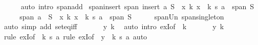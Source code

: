 \begin{isabellebody}
\ \ \ \ \isamarkupfalse%
\ {\isacharparenleft}{\kern0pt}auto\ intro{\isacharbang}{\kern0pt}{\isacharcolon}{\kern0pt}\ span{\isacharunderscore}{\kern0pt}add{\isacharparenright}{\kern0pt}\isanewline
{}\isamarkupfalse%
%
\endisatagproof
{\isafoldproof}%
%
\isadelimproof
\isanewline
%
\endisadelimproof
\isanewline
{}\isamarkupfalse%
\ span{\isacharunderscore}{\kern0pt}insert{\isacharcolon}{\kern0pt}\ {\isachardoublequoteopen}span\ {\isacharparenleft}{\kern0pt}insert\ a\ S{\isacharparenright}{\kern0pt}\ {\isacharequal}{\kern0pt}\ {\isacharbraceleft}{\kern0pt}x{\isachardot}{\kern0pt}\ {\isasymexists}k{\isachardot}{\kern0pt}\ {\isacharparenleft}{\kern0pt}x\ {\isacharminus}{\kern0pt}\ k\ {\isacharasterisk}{\kern0pt}s\ a{\isacharparenright}{\kern0pt}\ {\isasymin}\ span\ S{\isacharbraceright}{\kern0pt}{\isachardoublequoteclose}\isanewline
%
\isadelimproof
%
\endisadelimproof
%
\isatagproof
{}\isamarkupfalse%
\ {\isacharminus}{\kern0pt}\isanewline
\ \ \isamarkupfalse%
\ {\isachardoublequoteopen}span\ {\isacharparenleft}{\kern0pt}{\isacharbraceleft}{\kern0pt}a{\isacharbraceright}{\kern0pt}\ {\isasymunion}\ S{\isacharparenright}{\kern0pt}\ {\isacharequal}{\kern0pt}\ {\isacharbraceleft}{\kern0pt}x{\isachardot}{\kern0pt}\ {\isasymexists}k{\isachardot}{\kern0pt}\ {\isacharparenleft}{\kern0pt}x\ {\isacharminus}{\kern0pt}\ k\ {\isacharasterisk}{\kern0pt}s\ a{\isacharparenright}{\kern0pt}\ {\isasymin}\ span\ S{\isacharbraceright}{\kern0pt}{\isachardoublequoteclose}\isanewline
\ \ \ \ \isamarkupfalse%
\ span{\isacharunderscore}{\kern0pt}Un\ span{\isacharunderscore}{\kern0pt}singleton\isanewline
\ \ \ \ \isamarkupfalse%
\ {\isacharparenleft}{\kern0pt}auto\ simp\ add{\isacharcolon}{\kern0pt}\ set{\isacharunderscore}{\kern0pt}eq{\isacharunderscore}{\kern0pt}iff{\isacharparenright}{\kern0pt}\isanewline
\ \ \ \ \isamarkupfalse%
\ \ y\ k\ \isamarkupfalse%
\ {\isacharparenleft}{\kern0pt}auto\ intro{\isacharbang}{\kern0pt}{\isacharcolon}{\kern0pt}\ exI{\isacharbrackleft}{\kern0pt}of\ {\isacharunderscore}{\kern0pt}\ {\isachardoublequoteopen}k{\isachardoublequoteclose}{\isacharbrackright}{\kern0pt}{\isacharparenright}{\kern0pt}\isanewline
\ \ \ \ \isamarkupfalse%
\ \ y\ k\ \isamarkupfalse%
\ {\isacharparenleft}{\kern0pt}rule\ exI{\isacharbrackleft}{\kern0pt}of\ {\isacharunderscore}{\kern0pt}\ {\isachardoublequoteopen}k\ {\isacharasterisk}{\kern0pt}s\ a{\isachardoublequoteclose}{\isacharbrackright}{\kern0pt}{\isacharcomma}{\kern0pt}\ rule\ exI{\isacharbrackleft}{\kern0pt}of\ {\isacharunderscore}{\kern0pt}\ {\isachardoublequoteopen}y\ {\isacharminus}{\kern0pt}\ k\ {\isacharasterisk}{\kern0pt}s\ a{\isachardoublequoteclose}{\isacharbrackright}{\kern0pt}{\isacharparenright}{\kern0pt}\ auto\isanewline

\end{isabellebody}
